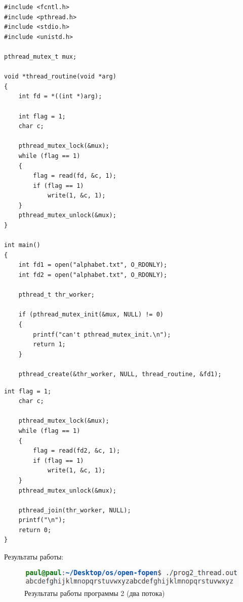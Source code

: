 \begin{center}
	\captionsetup{justification=raggedright,singlelinecheck=off}

	\begin{lstlisting}[label=lst:prog2-th-1,caption=Программа 2 --- два потока --- часть 1]
#include <fcntl.h>
#include <pthread.h>
#include <stdio.h>
#include <unistd.h>

pthread_mutex_t mux;

void *thread_routine(void *arg) 
{
    int fd = *((int *)arg);

    int flag = 1;
    char c;

    pthread_mutex_lock(&mux);
    while (flag == 1) 
    {
        flag = read(fd, &c, 1);
        if (flag == 1) 
            write(1, &c, 1);
    }
    pthread_mutex_unlock(&mux);
}

int main() 
{
    int fd1 = open("alphabet.txt", O_RDONLY);
    int fd2 = open("alphabet.txt", O_RDONLY);

    pthread_t thr_worker;

    if (pthread_mutex_init(&mux, NULL) != 0) 
    {
        printf("can't pthread_mutex_init.\n");
        return 1;
    }

    pthread_create(&thr_worker, NULL, thread_routine, &fd1);
	\end{lstlisting}
\end{center}

\clearpage

\begin{center}
	\captionsetup{justification=raggedright,singlelinecheck=off}

	\begin{lstlisting}[label=lst:prog2-th-2,caption=Программа 2 --- два потока --- часть 2]
		int flag = 1;
    char c;

    pthread_mutex_lock(&mux);
    while (flag == 1) 
    {
        flag = read(fd2, &c, 1);
        if (flag == 1) 
            write(1, &c, 1);
    }
    pthread_mutex_unlock(&mux);
    
    pthread_join(thr_worker, NULL);
    printf("\n");
    return 0;
}
	\end{lstlisting}
\end{center}

Результаты работы:

\begin{figure}[h]
	\centering
	\captionsetup{justification=centering}
	\includegraphics[width=150mm]{img/prog2_thread.png}
	\caption{Результаты работы программы 2 (два потока)}
	\label{fig:prog-2-th-result}
\end{figure}

